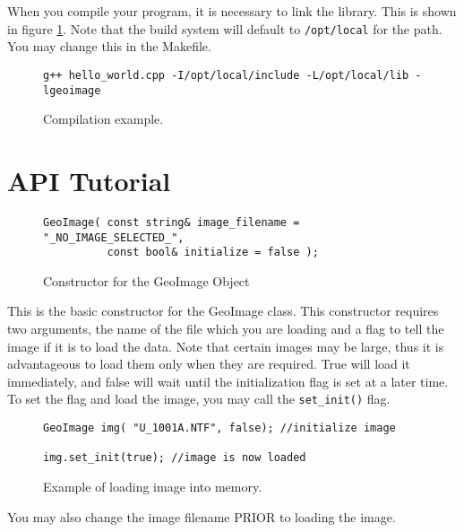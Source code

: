 \documentclass[10pt]{report}
\begin{document}
When you compile your program, it is necessary to link the library. This
is shown in figure \ref{fig:basic02}.  Note that the build system will 
default to \texttt{/opt/local} for the path.  You may change this in the Makefile.


\begin{figure}[!h]
\begin{verbatim}
g++ hello_world.cpp -I/opt/local/include -L/opt/local/lib -lgeoimage
\end{verbatim}
\caption{Compilation example.}
\label{fig:basic02}
\end{figure}



\section*{API Tutorial}

\begin{figure}[!h]
\begin{lstlisting}
GeoImage( const string& image_filename = "_NO_IMAGE_SELECTED_", 
          const bool& initialize = false );
\end{lstlisting}
\caption{Constructor for the GeoImage Object}
\label{fig:geoimage01}
\end{figure}

This is the basic constructor for the GeoImage class.  This constructor requires two arguments, 
the name of the file which you are loading and a flag to tell the image if it is to load the
data.  Note that certain images may be large, thus it is advantageous to load them only when they 
are required.  True will load it immediately, and false will wait until the initialization flag
is set at a later time. To set the flag and load the image, you may call the \texttt{set\_init()}
flag. 

\begin{figure}[!h]
\begin{lstlisting}
GeoImage img( "U_1001A.NTF", false); //initialize image

img.set_init(true); //image is now loaded
\end{lstlisting}
\caption{Example of loading image into memory.}
\label{fig:geoimage02}
\end{figure}

You may also change the image filename PRIOR to loading the image. 
\end{document}
